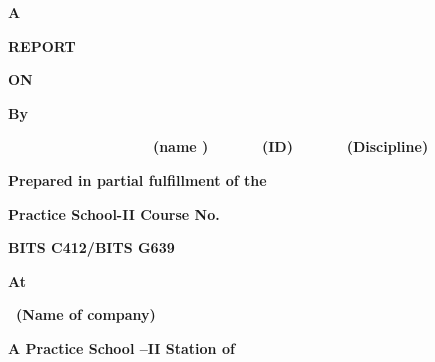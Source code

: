 \documentclass[letterpaper]{article}
\begin{document}
\bigskip


\bigskip


\bigskip


\bigskip


\bigskip


\bigskip


\bigskip


\bigskip


\bigskip

{\centering{}\bfseries
A
\par}

{\centering{}\bfseries
REPORT
\par}

{\centering{}\bfseries
ON
\par}


\bigskip


\bigskip


\bigskip


\bigskip

{\centering{}\bfseries
By
\par}


\bigskip

{\bfseries
\ \ \ \ \ \ \ \ \ \ \ \ \ \ \ \ \ \ (name ) \ \ \ \ \ \ (ID)
\ \ \ \ \ \ (Discipline)\ \  }


\bigskip

{\centering{}\bfseries
Prepared in partial fulfillment of the
\par}

{\centering{}\bfseries
Practice School-II Course No.
\par}

{\centering{}\bfseries
BITS C412/BITS G639
\par}


\bigskip

{\centering{}\bfseries
At
\par}


\bigskip

{\centering{}\bfseries
\ (Name of company)
\par}


\bigskip


\bigskip

{\centering{}\bfseries
A Practice School --II Station of
\par}
\end{document}
